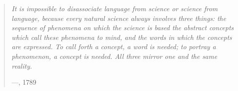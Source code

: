 

\cleardoublepage

\vspace*{100pt}
\begin{quotation}
\noindent\emph{%
It is impossible to disassociate language from science or science from
language, because every natural science always involves three things:
the sequence of phenomena on which the science is based the abstract
concepts which call these phenomena to mind, and the words in which
the concepts are expressed. To call forth a concept, a word is needed;
to portray a phenomenon, a concept is needed. All three mirror one and
the same reality.}

\begin{flushright}
---, 1789
\end{flushright}
\end{quotation}
